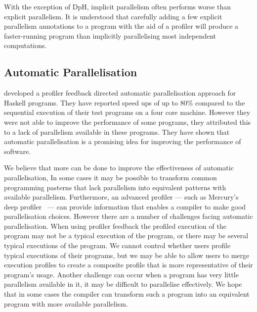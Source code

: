 With the exception of DpH, implicit parallelism often performs worse
than explicit parallelism.
It is understood that carefully adding a few explicit parallelism annotations
to a program with the aid of a profiler will produce a faster-running
program than implicitly parallelising most independent computations.

\subsection{Automatic Parallelisation}
\label{sec:lit_automatic-parallelisation}

\citet{harris_07_feedback_imp_par} developed a profiler
feedback directed automatic parallelisation approach for Haskell programs.
They have reported speed ups of up to 80\% compared to the sequential
execution of their test programs on a four core machine.
However they were not able to improve the performance of some
programs, they attributed this to a lack of parallelism
available in these programs.
They have shown that automatic parallelisation is a promising idea for
improving the performance of software.

We believe that more can be done to improve the effectiveness of
automatic parallelisation,
In some cases it may be possible to transform common programming
pasterns that lack parallelism into equivalent patterns with available
parallelism.
Furthermore, an advanced profiler --- such as Mercury's deep
profiler~\citep{conway:2001:mercury-deep} --- can provide information
that enables a compiler to make good parallelisation choices.
However there are a number of challenges facing automatic
parallelisation.
When using profiler feedback the profiled execution of the program may
not be a typical execution of the program, or there may be several
typical executions of the program.
We cannot control whether users profile typical executions of their
programs, but we may be able to allow users to merge execution
profiles to create a composite profile that is more representative of
their program's usage.
Another challenge can occur when a program has very little parallelism
available in it, it may be difficult to parallelise effectively.
We hope that in some cases the compiler can transform such a program
into an equivalent program with more available parallelism.

